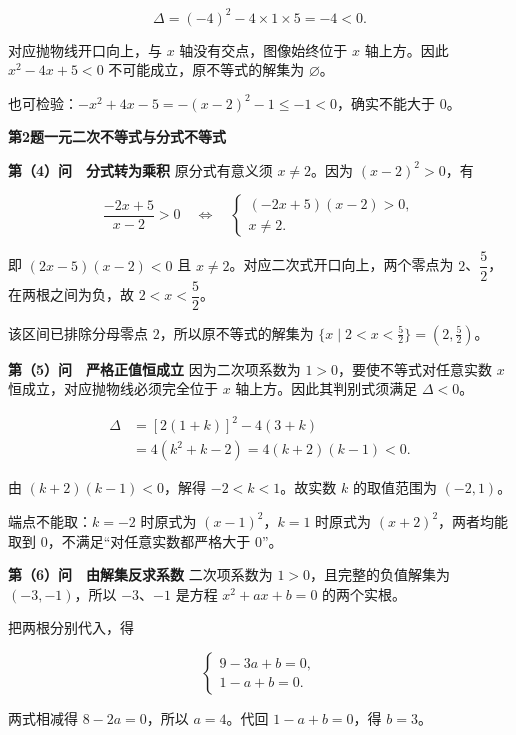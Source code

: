\documentclass[UTF8,zihao=-4]{ctexart}
\begin{document}
\[\Delta=(-4)^2-4\times1\times5=-4<0.\]\par
对应抛物线开口向上，与 $x$ 轴没有交点，图像始终位于 $x$ 轴上方。因此 $x^2-4x+5<0$ 不可能成立，原不等式的解集为 $\boxed{\varnothing}$。\par
也可检验：$-x^2+4x-5=-(x-2)^2-1\le-1<0$，确实不能大于 $0$。\par
\clearpage
{\Large\bfseries 第2题\quad 一元二次不等式与分式不等式}
\par{}
\textbf{第（4）问　分式转为乘积}\quad
原分式有意义须 $x\ne2$。因为 $(x-2)^2>0$，有\par
\[\frac{-2x+5}{x-2}>0\quad\Longleftrightarrow\quad\begin{cases}(-2x+5)(x-2)>0,\\x\ne2.\end{cases}\]\par
即 $(2x-5)(x-2)<0$ 且 $x\ne2$。对应二次式开口向上，两个零点为 $2$、$\dfrac52$，在两根之间为负，故 $2<x<\dfrac52$。\par
该区间已排除分母零点 $2$，所以原不等式的解集为 $\boxed{\{x\mid2<x<\frac52\}=(2,\frac52)}$。\par
\par{}
\textbf{第（5）问　严格正值恒成立}\quad
因为二次项系数为 $1>0$，要使不等式对任意实数 $x$ 恒成立，对应抛物线必须完全位于 $x$ 轴上方。因此其判别式须满足 $\Delta<0$。\par
\[\begin{aligned}\Delta&=[2(1+k)]^2-4(3+k)\\&=4(k^2+k-2)=4(k+2)(k-1)<0.\end{aligned}\]\par
由 $(k+2)(k-1)<0$，解得 $-2<k<1$。故实数 $k$ 的取值范围为 $\boxed{(-2,1)}$。\par
端点不能取：$k=-2$ 时原式为 $(x-1)^2$，$k=1$ 时原式为 $(x+2)^2$，两者均能取到 $0$，不满足“对任意实数都严格大于 $0$”。\par
\par{}
\textbf{第（6）问　由解集反求系数}\quad
二次项系数为 $1>0$，且完整的负值解集为 $(-3,-1)$，所以 $-3$、$-1$ 是方程 $x^2+ax+b=0$ 的两个实根。\par
把两根分别代入，得\par
\[\begin{cases}9-3a+b=0,\\1-a+b=0.\end{cases}\]\par
两式相减得 $8-2a=0$，所以 $a=4$。代回 $1-a+b=0$，得 $b=3$。\par
\end{document}
